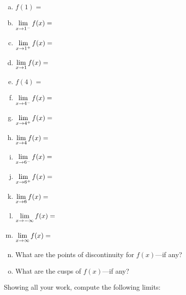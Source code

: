 \documentclass[12pt,letterpaper]{exam}
\begin{document}
\begin{questions}
\begin{enumerate}[(a)]
\item $f(1)=$ \vfill
\item $\displaystyle\lim_{x \to 1^-} f(x)=$ \vfill
\item $\displaystyle\lim_{x \to 1^+} f(x)=$ \vfill
\item $\displaystyle\lim_{x \to 1} f(x)=$ \vfill
\item $f(4)=$ \vfill
\item $\displaystyle\lim_{x \to 4^-} f(x)=$ \vfill
\item $\displaystyle\lim_{x \to 4^+} f(x)=$ \vfill
\item $\displaystyle\lim_{x \to 4} f(x)=$ \vfill
\item $\displaystyle\lim_{x \to 6^-} f(x)=$ \vfill
\item $\displaystyle\lim_{x \to 6^+} f(x)=$ \vfill
\item $\displaystyle\lim_{x \to 6} f(x)=$ \vfill
\item $\displaystyle\lim_{x \to -\infty} f(x)=$ \vfill
\item $\displaystyle\lim_{x \to \infty} f(x)=$ \vfill
\item What are the points of discontinuity for $f(x)$---if any? \vfill
\item What are the cusps of $f(x)$---if any? \vfill
\end{enumerate}



\newpage
\question Showing all your work, compute the following limits: \pvspace{0.3cm}




\end{questions}
\end{document}
